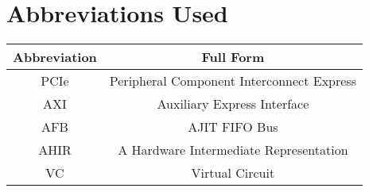 \chapter{Abbreviations Used}

\begin{center}
\begin{tabular}{c | c}
Abbreviation & Full Form \\
\hline
PCIe & Peripheral Component Interconnect Express \\
AXI & Auxiliary Express Interface\\
AFB & AJIT FIFO Bus \\
AHIR & A Hardware Intermediate Representation\\
VC & Virtual Circuit
\end{tabular}
\end{center}
